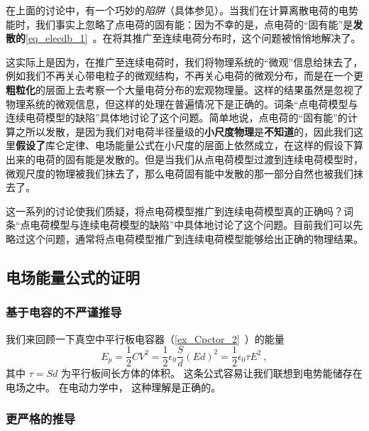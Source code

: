 在上面的讨论中，有一个巧妙的\textsl{陷阱}（具体参见\cite{GriffE}）。当我们在计算离散电荷的电势能时，我们事实上忽略了点电荷的固有能：因为不幸的是，点电荷的“固有能”是\textbf{发散的}\autoref{eq_elecdb_1}~。在将其推广至连续电荷分布时，这个问题被悄悄地解决了。

这实际上是因为，在推广至连续电荷时，我们将物理系统的“微观”信息给抹去了，例如我们不再关心带电粒子的微观结构，不再关心电荷的微观分布，而是在一个更\textbf{粗粒化}的层面上去考察一个大量电荷分布的宏观物理量。这样的结果虽然是忽视了物理系统的微观信息，但这样的处理在普遍情况下是正确的。词条“点电荷模型与连续电荷模型的缺陷”具体地讨论了这个问题。简单地说，点电荷的“固有能”的计算之所以发散，是因为我们对电荷半径量级的\textbf{小尺度物理}是\textbf{不知道}的，因此我们这里\textbf{假设了}库仑定律、电场能量公式在小尺度的层面上依然成立，在这样的假设下算出来的电荷的固有能是发散的。但是当我们从点电荷模型过渡到连续电荷模型时，微观尺度的物理被我们抹去了，那么电荷固有能中发散的那一部分自然也被我们抹去了。

这一系列的讨论使我们质疑，将点电荷模型推广到连续电荷模型真的正确吗？词条“点电荷模型与连续电荷模型的缺陷”中具体地讨论了这个问题。目前我们可以先略过这个问题，通常将点电荷模型推广到连续电荷模型能够给出正确的物理结果。

\subsection{电场能量公式的证明}

\subsubsection{基于电容的不严谨推导}
我们来回顾一下真空中平行板电容器（\autoref{ex_Cpctor_2}~）的能量
\begin{equation}
E_p = \frac12 CV^2 = \frac12 \epsilon_0 \frac Sd (Ed)^2 = \frac 12 \epsilon_0 \tau E^2~,
\end{equation}
其中 $\tau = Sd$ 为平行板间长方体的体积。 这条公式容易让我们联想到电势能储存在电场之中。 在电动力学中， 这种理解是正确的。

\subsubsection{更严格的推导}

